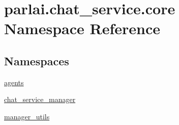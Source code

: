 \hypertarget{namespaceparlai_1_1chat__service_1_1core}{}\section{parlai.\+chat\+\_\+service.\+core Namespace Reference}
\label{namespaceparlai_1_1chat__service_1_1core}
\subsection*{Namespaces}
\begin{DoxyCompactItemize}
\item 
 \hyperlink{namespaceparlai_1_1chat__service_1_1core_1_1agents}{agents}
\item 
 \hyperlink{namespaceparlai_1_1chat__service_1_1core_1_1chat__service__manager}{chat\+\_\+service\+\_\+manager}
\item 
 \hyperlink{namespaceparlai_1_1chat__service_1_1core_1_1manager__utils}{manager\+\_\+utils}
\end{DoxyCompactItemize}
